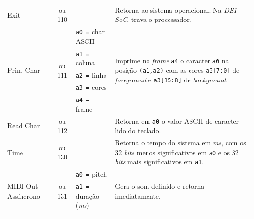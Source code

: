 \begin{longtable}{|l|c|p{3cm}|l |}
        \hline
        \multirow{3}{*}{Exit}               & \multirow{3}{*}{\parbox{0.6cm}{ ou 110}}
            &                               & \multirow{3}{*}{\parbox{7cm}{Retorna ao sistema operacional. Na \textit{DE1-SoC}, trava o processador.}}\\*
            & & & \\*
            & & & \\
        \hline
        \multirow{5}{*}{Print Char}         & \multirow{5}{*}{\parbox{0.6cm}{ ou 111}}
              & \texttt{a0 =} char ASCII  & \multirow{5}{*}{\parbox{7cm}{Imprime no \textit{frame} \texttt{a4} o caracter \texttt{a0} na
                                                posição \texttt{(a1,a2)} com as cores \texttt{a3[7:0]} de \textit{foreground} e \texttt{a3[15:8]} de \textit{background}.}}\\*
            & & \texttt{a1 =} coluna      & \\*
            & & \texttt{a2 =} linha       & \\*
            & & \texttt{a3 =} cores       & \\*
            & & \texttt{a4 =} frame       & \\
        \hline
        \multirow{3}{*}{Read Char}          & \multirow{3}{*}{\parbox{0.6cm}{ ou 112}}
            &                               & \multirow{3}{*}{\parbox{7cm}{Retorna em \texttt{a0} o valor ASCII do caracter lido do teclado.}}\\*
            & & & \\*
            & & & \\
        \hline
        \multirow{3}{*}{Time}               & \multirow{3}{*}{\parbox{0.6cm}{ ou 130}}
            &                               & \multirow{3}{*}{\parbox{7cm}{Retorna o tempo do sistema em \textit{ms}, com os 32 \textit{bits} menos significativos em \texttt{a0}
                                                e os 32 \textit{bits} mais significativos em \texttt{a1}.}}\\*
            & & & \\*
            & & & \\
        \hline
        \multirow{4}{*}{MIDI Out Assíncrono }   & \multirow{4}{*}{\parbox{0.6cm}{ ou 131}}
              & \texttt{a0 =} pitch       & \multirow{4}{*}{\parbox{7cm}{Gera o som definido e retorna imediatamente.}}\\*
            & & \texttt{a1 =} duração (\textit{ms}) & \\*

\end{longtable}
